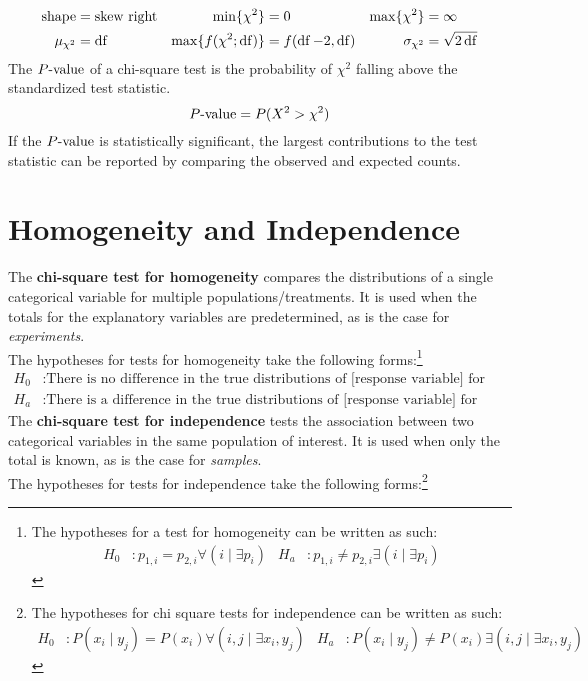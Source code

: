 \documentclass[../AP_Statistics.tex]{subfiles}
\begin{document}
			\begin{align*}
				\text{shape} &= \text{skew right} & \min\{\chi^2\} &= 0 & \max\{\chi^2\} &= \infty \\
				\mu_{\chi^2} &= \operatorname{\mathrm{df}} & \max\{f(\chi^2;\operatorname{\mathrm{df}})\} &= f(\operatorname{\mathrm{df}} - 2, \operatorname{\mathrm{df}}) & \sigma_{\chi^2} &= \sqrt{2\operatorname{\mathrm{df}}}
			\end{align*}
			The $P\text{-value}$ of a chi-square test is the probability of $\chi^2$ falling above the standardized test statistic.
			\[P\text{-value} = P(X^2 > \chi^2)\]
			If the $P\text{-value}$ is statistically significant, the largest contributions to the test statistic can be reported by comparing the observed and expected counts. 
		\section{Homogeneity and Independence}
			The \textbf{chi-square test for homogeneity} compares the distributions of a single categorical variable for multiple populations/treatments. It is used when the totals for the explanatory variables are predetermined, as is the case for \emph{experiments}. \\
			The hypotheses for tests for homogeneity take the following forms:\footnote{The hypotheses for a test for homogeneity can be written as such:
			\begin{align*}
				H_0&: p_{1, i} = p_{2, i} \forall (i \mid \exists p_i) & H_a&: p_{1, i} \ne p_{2, i} \exists (i \mid \exists p_i)
			\end{align*}}
			\begin{align*}
				H_0&: \text{There is no difference in the true distributions of [response variable] for [different populations]} \\
				H_a&: \text{There is a difference in the true distributions of [response variable] for [different populations]}
			\end{align*}
			The \textbf{chi-square test for independence} tests the association between two categorical variables in the same population of interest. It is used when only the total is known, as is the case for \emph{samples}. \\
			The hypotheses for tests for independence take the following forms:\footnote{The hypotheses for chi square tests for independence can be written as such:
			\begin{align*}
				H_0&: P(x_i \mid y_j) = P(x_i) \forall (i, j \mid \exists x_i, y_j) & H_a&: P(x_i \mid y_j) \ne P(x_i) \exists (i, j \mid \exists x_i, y_j)
			\end{align*}}
\end{document}
